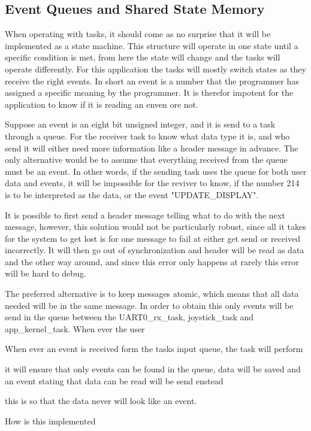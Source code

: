 \subsection{Event Queues and Shared State Memory}
\label{sec:EventQueuesandSharedStateMemory}

When operating with tasks, it should come as no surprise that it will be implemented as a state machine. This structure will operate in one state until a specific condition is met, from here the state will change and the tasks will operate differently. For this application the tasks will mostly switch states as they receive the right events. In short an event is a number that the programmer has assigned a specific meaning by the programmer. It is therefor impotent for the application to know if it is reading an enven ore not.  

Suppose an event is an eight bit unsigned integer, and it is send to a task through a queue. For the receiver task to know what data type it is, and who send it will either need more information like a header message in advance. The only alternative would be to assume that everything received from the queue must be an event. In other words, if the sending task uses the queue for both user data and events, it will be impossible for the reviver to know, if the number 214 is to be interpreted as the data, or the event "UPDATE\_DISPLAY". 

It is possible to first send a header message telling what to do with the next message, however, this solution would not be particularly robust, since all it takes for the system to get lost is for one message to fail at either get send or received incorrectly. It will then go out of synchronization and header will be read as data and the other way around, and since this error only happens at rarely this error will be hard to debug. 

The preferred alternative is to keep messages atomic, which means that all data needed will be in the same message. In order to obtain this only events will be send in the queue between the UART0\_rx\_task, joystick\_task and app\_kernel\_task. When ever the user 
 
When ever an event is received form the tasks input queue, the task will perform 


it will ensure that only events can be found in the queue, data will be saved and an event stating that data can be read will be send enstead

this is so that the data never will look like an event.

How is this implemented
